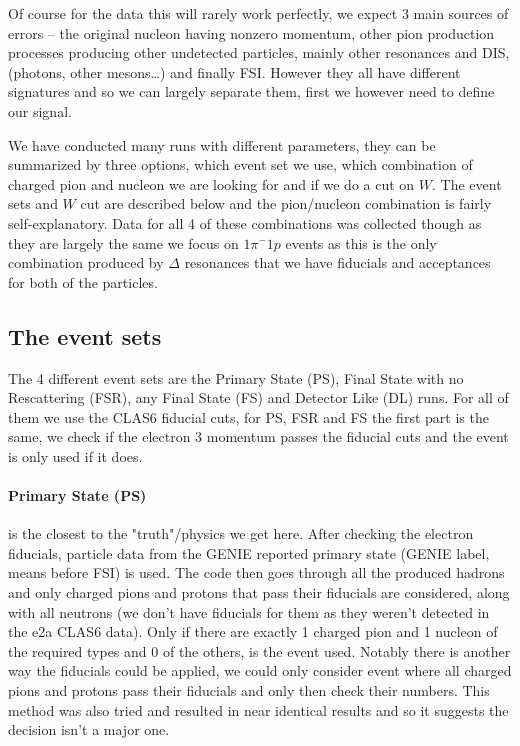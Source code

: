 \documentclass[a4paper,12pt]{article}
\begin{document}
Of course for the data this will rarely work perfectly, we expect 3 main sources of errors -- the original nucleon having nonzero momentum, other pion production processes producing other undetected particles, mainly other resonances and DIS, (photons, other mesons\ldots) and finally FSI.
However they all have different signatures and so we can largely separate them, first we however need to define our signal.

We have conducted many runs with different parameters, they can be summarized by three options, which event set we use, which combination of charged pion and nucleon we are looking for and if we do a cut on $W$.
The event sets and $W$ cut are described below and the pion/nucleon combination is fairly self-explanatory.
Data for all 4 of these combinations was collected though as they are largely the same we focus on $1\pi^-1p$ events as this is the only combination produced by $\Delta$ resonances that we have fiducials and acceptances for both of the particles.

\subsection{The event sets}
The 4 different event sets are the Primary State (PS), Final State with no Rescattering (FSR), any Final State (FS) and Detector Like (DL) runs.
For all of them we use the CLAS6 fiducial cuts, for PS, FSR and FS the first part is the same, we check if the electron 3 momentum passes the fiducial cuts and the event is only used if it does.

\paragraph{Primary State (PS)} is the closest to the "truth"/physics we get here.
After checking the electron fiducials, particle data from the GENIE reported primary state (GENIE label, means before FSI) is used.
The code then goes through all the produced hadrons and only charged pions and protons that pass their fiducials are considered, along with all neutrons (we don't have fiducials for them as they weren't detected in the e2a CLAS6 data).
Only if there are exactly 1 charged pion and 1 nucleon of the required types and 0 of the others, is the event used.
Notably there is another way the fiducials could be applied, we could only consider event where all charged pions and protons pass their fiducials and only then check their numbers.
This method was also tried and resulted in near identical results and so it suggests the decision isn't a major one.
\end{document}

